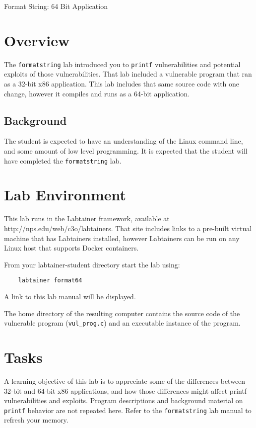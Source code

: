 


\begin{center}
{\LARGE Format String: 64 Bit Application}
\vspace{0.1in}\\
\end{center}

\section{Overview}
The {\tt formatstring} lab introduced you to {\tt printf} vulnerabilities and potential exploits of those
vulnerabilities.  That lab included a vulnerable program that ran as a 32-bit x86 application.  
This lab includes that same source code with one change, however it compiles and runs as a 64-bit application.

\subsection {Background}
The student is expected to have an understanding of the Linux command line, and some amount of low level programming.
It is expected that the student will have completed the {\tt formatstring} lab.

\section{Lab Environment}
\label{environment}
This lab runs in the Labtainer framework,
available at http://nps.edu/web/c3o/labtainers.
That site includes links to a pre-built virtual machine
that has Labtainers installed, however Labtainers can
be run on any Linux host that supports Docker containers.

From your labtainer-student directory start the lab using:
\begin{verbatim}
    labtainer format64
\end{verbatim}
\noindent A link to this lab manual will be displayed.  

The home directory of the resulting computer contains the source code of the vulnerable 
program ({\tt vul\_prog.c}) and an executable instance of the program.

\section{Tasks}

A learning objective of this lab is to appreciate some of the differences between 32-bit and 64-bit x86 applications,
and how those differences might affect printf vulnerabilities and exploits.  Program descriptions and background
material on {\tt printf} behavior are not repeated here.  Refer to the {\tt formatstring} lab manual to refresh
your memory.

